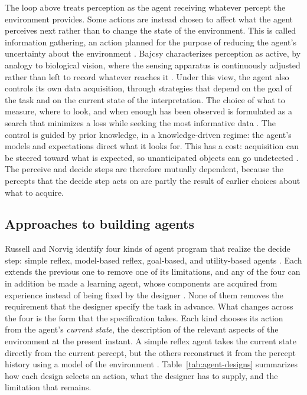 The loop above treats perception as the agent receiving whatever percept the environment provides. Some actions are instead chosen to affect what the agent perceives next rather than to change the state of the environment. This is called information gathering, an action planned for the purpose of reducing the agent's uncertainty about the environment \cite[Chap.~2]{russellArtificialIntelligenceModern2022}. Bajcsy characterizes perception as active, by analogy to biological vision, where the sensing apparatus is continuously adjusted rather than left to record whatever reaches it \cite{bajcsyActivePerception1988}. Under this view, the agent also controls its own data acquisition, through strategies that depend on the goal of the task and on the current state of the interpretation. The choice of what to measure, where to look, and when enough has been observed is formulated as a search that minimizes a loss while seeking the most informative data \cite{bajcsyActivePerception1988}. The control is guided by prior knowledge, in a knowledge-driven regime: the agent's models and expectations direct what it looks for. This has a cost: acquisition can be steered toward what is expected, so unanticipated objects can go undetected \cite{bajcsyActivePerception1988}. The perceive and decide steps are therefore mutually dependent, because the percepts that the decide step acts on are partly the result of earlier choices about what to acquire.

\subsection{Approaches to building agents}
\label{subsec:building-approaches}

Russell and Norvig identify four kinds of agent program that realize the decide step: simple reflex, model-based reflex, goal-based, and utility-based agents \cite[Chap.~2]{russellArtificialIntelligenceModern2022}. Each extends the previous one to remove one of its limitations, and any of the four can in addition be made a learning agent, whose components are acquired from experience instead of being fixed by the designer \cite[Chap.~2]{russellArtificialIntelligenceModern2022}. None of them removes the requirement that the designer specify the task in advance. What changes across the four is the form that the specification takes. Each kind chooses its action from the agent's \emph{current state}, the description of the relevant aspects of the environment at the present instant. A simple reflex agent takes the current state directly from the current percept, but the others reconstruct it from the percept history using a model of the environment \cite[Chap.~2]{russellArtificialIntelligenceModern2022}. Table~\ref{tab:agent-designs} summarizes how each design selects an action, what the designer has to supply, and the limitation that remains.

